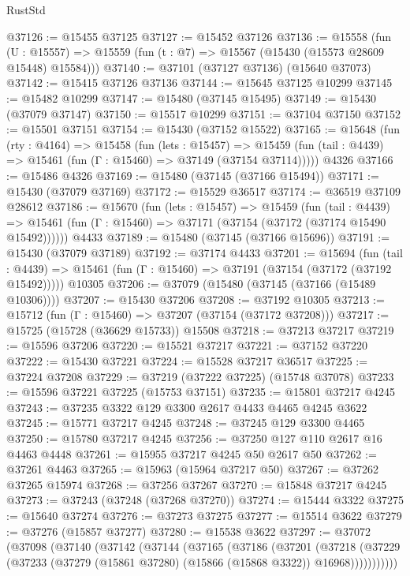 \begin{lexlean}{RustStd}
\begin{coremodule}
{\begin{coremodule}
{{{{{{{{{{{{{{{{{{{{{{{{{{{{{{{{{{{{{{{{{{{{{{{{{{{{{{{{{{{{@37126 := @15455 @37125
@37127 := @15452 @37126
@37136 := @15558
    (fun (U : @15557) => @15559 (fun (t : @7) => @15567 (@15430 (@15573 @28609 @15448) @15584)))
@37140 := @37101 (@37127 @37136) (@15640 @37073)
@37142 := @15415 @37126 @37136
@37144 := @15645 @37125 @10299
@37145 := @15482 @10299
@37147 := @15480 (@37145 @15495)
@37149 := @15430 (@37079 @37147)
@37150 := @15517 @10299
@37151 := @37104 @37150
@37152 := @15501 @37151
@37154 := @15430 (@37152 @15522)
@37165 := @15648
    (fun (rty : @4164) =>
    @15458
      (fun (lets : @15457) =>
      @15459 (fun (tail : @4439) => @15461 (fun (Γ : @15460) => @37149 (@37154 @37114)))))
    @4326
@37166 := @15486 @4326
@37169 := @15480 (@37145 (@37166 @15494))
@37171 := @15430 (@37079 @37169)
@37172 := @15529 @36517
@37174 := @36519 @37109 @28612
@37186 := @15670
    (fun (lets : @15457) =>
    @15459
      (fun (tail : @4439) =>
      @15461 (fun (Γ : @15460) => @37171 (@37154 (@37172 (@37174 @15490 @15492))))))
    @4433
@37189 := @15480 (@37145 (@37166 @15696))
@37191 := @15430 (@37079 @37189)
@37192 := @37174 @4433
@37201 := @15694
    (fun (tail : @4439) => @15461 (fun (Γ : @15460) => @37191 (@37154 (@37172 (@37192 @15492)))))
    @10305
@37206 := @37079 (@15480 (@37145 (@37166 (@15489 @10306))))
@37207 := @15430 @37206
@37208 := @37192 @10305
@37213 := @15712 (fun (Γ : @15460) => @37207 (@37154 (@37172 @37208)))
@37217 := @15725 (@15728 (@36629 @15733)) @15508
@37218 := @37213 @37217
@37219 := @15596 @37206
@37220 := @15521 @37217
@37221 := @37152 @37220
@37222 := @15430 @37221
@37224 := @15528 @37217 @36517
@37225 := @37224 @37208
@37229 := @37219 (@37222 @37225) (@15748 @37078)
@37233 := @15596 @37221 @37225 (@15753 @37151)
@37235 := @15801 @37217 @4245
@37243 := @37235 @3322 @129 @3300 @2617 @4433 @4465 @4245 @3622
@37245 := @15771 @37217 @4245
@37248 := @37245 @129 @3300 @4465
@37250 := @15780 @37217 @4245
@37256 := @37250 @127 @110 @2617 @16 @4463 @4448
@37261 := @15955 @37217 @4245 @50 @2617 @50
@37262 := @37261 @4463
@37265 := @15963 (@15964 @37217 @50)
@37267 := @37262 @37265 @15974
@37268 := @37256 @37267
@37270 := @15848 @37217 @4245
@37273 := @37243 (@37248 (@37268 @37270))
@37274 := @15444 @3322
@37275 := @15640 @37274
@37276 := @37273 @37275
@37277 := @15514 @3622
@37279 := @37276 (@15857 @37277)
@37280 := @15538 @3622
@37297 := @37072
    (@37098
      (@37140
        (@37142
          (@37144
            (@37165
              (@37186
                (@37201
                  (@37218
                    (@37229
                      (@37233 (@37279 (@15861 @37280) (@15866 (@15868 @3322)) @16968)))))))))))
}}}}}}}}}}}}}}}}}}}}}}}}}}}}}}}}}}}}}}}}}}}}}}}}}}}}}}}}}}}}
\end{coremodule}}
\end{coremodule}
\end{lexlean}
